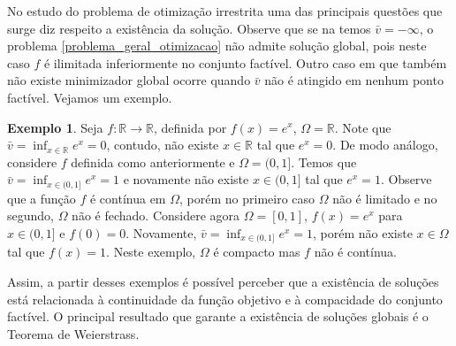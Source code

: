 \documentclass[12pt,a4paper]{scrartcl}
\def\RR{\mathds{R}}
\theoremstyle{definition}%
\newtheorem{exem}{Exemplo}
\begin{document}
No estudo do problema de otimização irrestrita uma das principais questões que surge diz respeito a existência da solução. Observe que se na  temos $\bar{v} = - \infty$, o problema \eqref{problema_geral_otimizacao} não admite solução global, pois neste caso $f$ é ilimitada inferiormente no conjunto factível. Outro caso em que também não existe minimizador global ocorre quando $\bar{v}$ não é atingido em nenhum ponto factível. Vejamos um exemplo.

\begin{exem}
Seja $f: \RR \rightarrow \RR$, definida por $f(x) = e^{x}$, $\Omega = \RR$. Note que $\bar{v} = \inf_{x \in \RR} e^{x} = 0$, contudo, não existe $x \in \RR$ tal que $e^{x} = 0$. 
De modo análogo, considere $f$ definida como anteriormente e $\Omega = (0,1]$. Temos que $\bar{v} = \inf_{x \in (0,1]} e^{x} = 1$ e novamente não existe $x \in (0,1]$ tal que $e^{x}=1$. Observe que a função $f$ é contínua em $\Omega$, porém no primeiro caso $\Omega$ não é limitado e no segundo, $\Omega$ não é fechado. 
Considere agora $\Omega = [0,1]$, $f(x)=e^{x}$ para $x \in (0,1]$ e $f(0)=0$. Novamente, $\bar{v} = \inf_{x \in (0,1]} e^{x} = 1$, porém não existe $x\in \Omega$ tal que $f(x)=1$. Neste exemplo, $\Omega$ é compacto mas $f$ não é contínua.
\end{exem}

Assim, a partir desses exemplos é possível perceber que a existência de soluções está relacionada à continuidade da função objetivo e à compacidade do conjunto factível. O principal resultado que garante a existência de soluções globais é o Teorema de Weierstrass.
\end{document}
